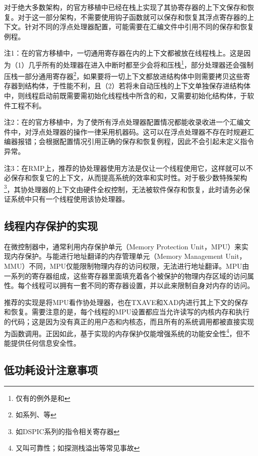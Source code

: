 对于绝大多数架构，的官方移植中已经在栈上实现了其协寄存器的上下文保存和恢复。对于这一部分架构，不需要使用钩子函数就可以保存和恢复其浮点寄存器的上下文。针对不同的浮点处理器配置，可能需要在汇编文件中引用不同的保存和恢复例程。

注1：在的官方移植中，一切通用寄存器在内的上下文都被放在线程栈上。这是因为（1）几乎所有的处理器在进入中断时都至少会将和压栈\footnote{仅有的例外是和}，部分处理器还会强制压栈一部分通用寄存器\footnote{如系列、等}，如果要将一切上下文都放进结构体中则需要拷贝这些寄存器到结构体，于性能不利，且（2）若将未自动压栈的上下文单独保存进结构体中，则线程启动前既需要需初始化线程栈中所含的和，又需要初始化结构体，于软件工程不利。

注2：在的官方移植中，为了使所有浮点处理器配置情况都能收录收进一个汇编文件中，对浮点处理器的操作一律采用机器码。这可以在浮点处理器不存在时规避汇编器报错；会根据配置情况引用正确的保存和恢复例程，因此不会引起未定义指令异常。

注3：在RMP上，推荐的协处理器使用方法是仅让一个线程使用它，这样就可以不必保存和恢复它的上下文，从而提高系统的效率和实时性。对于极少数特殊架构\footnote{如DSPIC系列的指令相关寄存器}，其协处理器的上下文由硬件全权控制，无法被软件保存和恢复，此时请务必保证系统中只有一个线程使用该协处理器。

\subsection{线程内存保护的实现}\label{subsec:implementation-of-thread-memory-protection}

在微控制器中，通常利用内存保护单元（Memory Protection
Unit，MPU）来实现内存保护。与能进行地址翻译的内存管理单元（Memory
Management
Unit，MMU）不同，MPU仅能限制物理内存的访问权限，无法进行地址翻译。MPU由一系列的寄存器组成，这些寄存器里面填充着各个被保护的物理内存区域的访问属性。每个线程可以拥有一套不同的寄存器设置，并以此来限制自身对内存的访问。

推荐的实现是将MPU看作协处理器，也在TXAVE和XAD内进行其上下文的保存和恢复。需要注意的是，每个线程的MPU设置都应当允许读写的内核内存和执行的代码；这是因为没有真正的用户态和内核态，而且所有的系统调用都被直接实现为函数调用。正因如此，基于实现的内存保护仅能增强系统的功能安全性\footnote{又叫可靠性；如探测栈溢出等常见事故}，但不能提供任何信息安全性。

\subsection{低功耗设计注意事项}\label{subsec:low-power-design-considerations}

